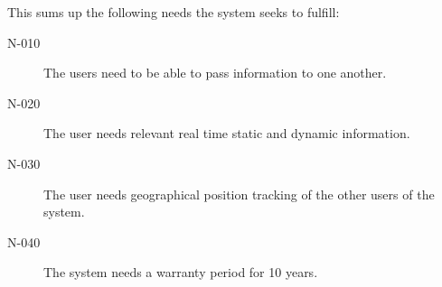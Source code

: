 This sums up the following needs the system seeks to fulfill:

\begin{description}
\item[N-010] The users need to be able to pass information to one another. 
\item[N-020] The user needs relevant real time static and dynamic information. 
\item[N-030] The user needs geographical position tracking of the other users of the system.
\item[N-040] The system needs a warranty period for 10 years. 
\end{description}
	